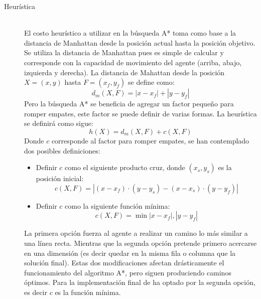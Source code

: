 \documentclass[letter, titlepage, 10pt]{article}
\newcommand{\abs}[1]{\left\vert#1\right\vert}
\begin{document}
\begin{description}
    \item[Heurística] \hfill \\
  El costo heurístico a utilizar en la búsqueda A* toma como base a la distancia de Manhattan desde la posición actual hasta la posición objetivo. Se utiliza la distancia de Manhattan pues es simple de calcular y corresponde con la capacidad de movimiento del agente (arriba, abajo, izquierda y derecha). La distancia de Mahattan desde la posición $X = (x,y)$ hasta $F = (x_f,y_f)$ se define como:
    \begin{displaymath}
      d_m(X,F) = \abs{x-x_f} + \abs{y-y_f} 
    \end{displaymath}
    Pero la búsqueda A* se beneficia de agregar un factor pequeño para romper empates, este factor se puede definir de varias formas.
  La heurística se definirá como sigue:   
  \begin{displaymath}
      h(X) = d_m(X,F) + c(X,F) 
    \end{displaymath}   
    Donde $c$ corresponde al factor para romper empates, se han contemplado dos posibles definiciones:
  \begin{itemize}
    \item Definir $c$ como el siguiente producto cruz, donde $(x_s,y_s)$ es la posición inicial:
      \begin{displaymath}
          c(X,F) = \abs{(x-x_f)\cdot (y-y_s) - (x-x_s)\cdot (y-y_f)}
        \end{displaymath}   
    \item Definir $c$ como la siguiente función mínima:
      \begin{displaymath}
          c(X,F) = \min{\abs{x-x_f},\abs{y-y_f}} 
        \end{displaymath}          
  \end{itemize}         
    La primera opción fuerza al agente a realizar un camino lo más similar a una línea recta. Mientras que la segunda opción pretende primero acercarse en una dimensión (es decir quedar en la misma fila o columna que la solución final). Estas dos modificaciones afectan drásticamente el funcionamiento del algoritmo A*, pero siguen produciendo caminos óptimos. Para la implementación final de ha optado por la segunda opción, es decir $c$ es la función mínima.

\end{description}

\end{document}
